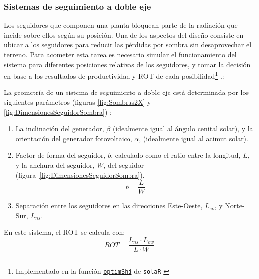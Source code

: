 \subsubsection{Sistemas de seguimiento a doble eje}

Los seguidores que componen una planta bloquean parte de la radiación
que incide sobre ellos según su posición. Una de los aspectos del
diseño consiste en ubicar a los seguidores para reducir las pérdidas
por sombra sin desaprovechar el terreno. Para acometer esta tarea
es necesario simular el funcionamiento del sistema para diferentes
posiciones relativas de los seguidores, y tomar la decisión en base
a los resultados de productividad y ROT de cada
posibilidad\footnote{Implementado en la función \href{http://search.r-project.org/R/library/solaR/html/optimShd.html}{\texttt{optimShd}} de
  \texttt{solaR} \cite{Perpinan2012b}} \cite{Perpinan2008}.:

La geometría de un sistema de seguimiento a doble eje está determinada
por los siguientes parámetros (figuras \ref{fig:Sombras2X} y \ref{fig:DimensionesSeguidorSombra})
: 
\begin{enumerate}
\item La inclinación del generador, $\beta$ (idealmente igual al ángulo
cenital solar), y la orientación del generador fotovoltaico, $\alpha$,
(idealmente igual al acimut solar).
\item Factor de forma del seguidor, $b$,
calculado como el ratio entre la longitud, $L$, y la anchura del
seguidor, $W$,
del seguidor (figura~\ref{fig:DimensionesSeguidorSombra}).
\begin{equation}
b=\frac{L}{W}
\end{equation}

\item Separación entre los seguidores en las direcciones Este-Oeste, 
$L_{eo}$,
y Norte-Sur, $L_{ns}$. 
\end{enumerate}
%
En este sistema, el ROT se calcula con:
\begin{equation}
  \label{eq:ROT2x}
  ROT=\frac{L_{ns} \cdot L_{ew}}{L \cdot W}
\end{equation}

